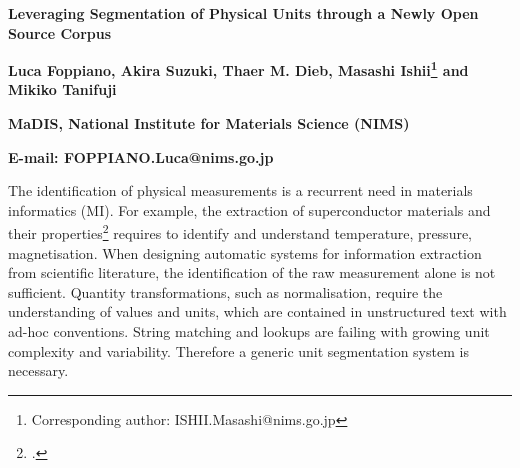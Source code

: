 \documentclass[a4paper,11pt]{article}
\begin{document}
\renewcommand{\baselinestretch}{1.20}\small\normalsize

\begin{center}
  
  \textbf{\large Leveraging Segmentation of Physical Units through a Newly Open Source Corpus}
  
  \textbf{Luca Foppiano, Akira Suzuki, Thaer M. Dieb, Masashi Ishii\footnote{Corresponding author: ISHII.Masashi@nims.go.jp} and Mikiko Tanifuji}
  
  \textbf{MaDIS, National Institute for Materials Science (NIMS)}
  
   \textbf{E-mail: FOPPIANO.Luca@nims.go.jp}
\end{center}


The identification of physical measurements is a recurrent need in materials informatics (MI). For example, the extraction of superconductor materials and their properties\footcite{foppiano2019proposal} requires to identify and understand temperature, pressure, magnetisation.
When designing automatic systems for information extraction from scientific literature, the identification of the raw measurement alone is not sufficient. Quantity transformations, such as normalisation, require the understanding of values and units, which are contained in unstructured text with ad-hoc conventions. 
String matching and lookups are failing with growing unit complexity and variability. Therefore a generic unit segmentation system is necessary.
\end{document}
